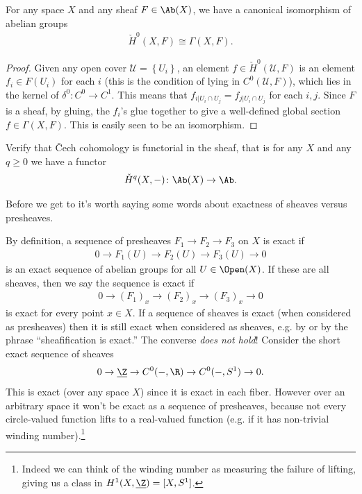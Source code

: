 \documentclass[11pt]{book}
\begin{document}
\begin{proposition}\label{prop:Cech-0-is-global-sections} 
For any space $X$ and any sheaf $F\in\Ab(X)$, we have a canonical isomorphism of abelian groups
\begin{align*}
    \check{H}^0(X,F) \cong \Gamma(X,F).
\end{align*}
\end{proposition}
\begin{proof} Given any open cover $\mathcal{U} = \left\{ U_i \right\}$, an element $f \in \check{H}^0(\mathcal{U},F)$ is an element $f_i \in F(U_i)$ for each $i$ (this is the condition of lying in $C^0(\mathcal{U},F)$), which lies in the kernel of $\delta^0 \colon C^0 \to C^1$. This means that $f_{i|U_i\cap U_j} = f_{j|U_i\cap U_j}$ for each $i,j$. Since $F$ is a sheaf, by gluing, the $f_i$'s glue together to give a well-defined global section $f\in \Gamma(X,F)$. This is easily seen to be an isomorphism.
\end{proof}

\begin{exercise} Verify that \v{C}ech cohomology is functorial in the sheaf, that is for any $X$ and any $q\ge 0$ we have a functor
\begin{align*}
    \check{H}^q(X,-) \colon \Ab(X) \to \Ab.
\end{align*}
\end{exercise}

Before we get to  it's worth saying some words about exactness of sheaves versus presheaves.

\begin{remark}[On exactness] By definition, a sequence of presheaves $F_1\to F_2 \to F_3$ on $X$ is exact if
\begin{align*}
    0 \to F_1(U) \to F_2(U) \to F_3(U) \to 0
\end{align*}
is an exact sequence of abelian groups for all $U \in \Open(X)$. If these are all sheaves, then we say the sequence is exact if
\begin{align*}
    0 \to (F_1)_x \to (F_2)_x \to (F_3)_x \to 0
\end{align*}
is exact for every point $x\in X$. If a sequence of sheaves is exact (when considered as presheaves) then it is still exact when considered as sheaves, e.g. by  or by the phrase ``sheafification is exact.'' The converse \emph{does not hold}! Consider the short exact sequence of sheaves
\begin{align*}
    0 \to \underline{\Z} \to C^0(-,\R) \to C^0(-,S^1) \to 0.
\end{align*}
This is exact (over any space $X$) since it is exact in each fiber. However over an arbitrary space it won't be exact as a sequence of presheaves, because not every circle-valued function lifts to a real-valued function (e.g. if it has non-trivial winding number).\footnote{Indeed we can think of the winding number as measuring the failure of lifting, giving us a class in $H^1(X,\underline{\Z}) = [X,S^1]$.}
\end{remark}
\end{document}
